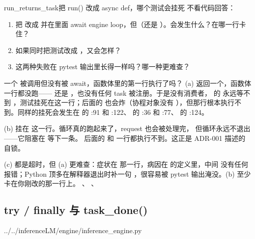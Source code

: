 \begin{checkpoint}{run_returns_task}{把 run() 改成 async def，哪个测试会挂死}
不看代码回答：
\begin{enumerate}[label=(\alph*)]
  \item 把  改成  并在里面 await engine loop，但（还是 ）。会发生什么？在哪一行卡住？
  \item 如果同时把测试改成 ，又会怎样？
  \item 这两种失败在 pytest 输出里长得一样吗？哪一种更难查？
\end{enumerate}
\hint 一个  被调用但没有被 await，函数体里的第一行执行了吗？
\ifshowanswers
\tcblower
\answer (a)  返回一个，函数体一行都没跑—— 还是
，也没有任何 task 被注册。于是没有消费者，
 的  永远等不到
，测试挂死在这一行；后面的  也会炸（协程对象没有
），但那行根本执行不到。同样的挂死会发生在
 的 :91 和 :122、 的 :36 和 :77、
 的 :124。

(b) 挂在  这一行。循环真的跑起来了，request 也会被处理完，
但循环永远不退出——它阻塞在  等下一条。
后面的  和  一行都执行不到。这正是 ADR-001 描述的自锁。

(c) 都是超时，但 (a) 更难查：症状在  那一行，病因在  的定义里，中间
没有任何报错；Python 顶多在解释器退出时补一句 ，很容易被 pytest 输出淹没。(b) 至少卡在你刚改的那一行上。
\whereincode {}、
、
\fi
\end{checkpoint}

\subsection{try / finally 与 task\_done()}
\label{sec:a-loop-task-done}

%
  {../../inferenceLM/engine/inference_engine.py}

